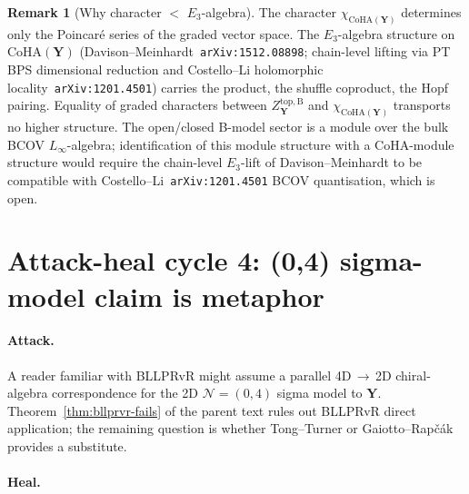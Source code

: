 \documentclass[11pt]{amsart}
\theoremstyle{definition}
\newtheorem{remark}[theorem]{Remark}
\providecommand{\CoHA}{\mathrm{CoHA}}
\providecommand{\bY}{\mathbf{Y}}
\providecommand{\cN}{\mathcal{N}}
\begin{document}
\begin{remark}[Why character $<$ $E_3$-algebra]
The character $\chi_{\CoHA(\bY)}$ determines only the Poincaré series
of the graded vector space. The $E_3$-algebra structure on $\CoHA(\bY)$
(Davison--Meinhardt~\texttt{arXiv:1512.08898}; chain-level
lifting via PT BPS dimensional reduction and Costello--Li holomorphic
locality~\texttt{arXiv:1201.4501}) carries the product, the shuffle
coproduct, the Hopf pairing. Equality of graded characters between
$Z^{\mathrm{top,B}}_{\bY}$ and $\chi_{\CoHA(\bY)}$ transports no
higher structure. The open/closed B-model sector is a module over the
bulk BCOV $L_\infty$-algebra; identification of this module structure
with a $\CoHA$-module structure would require the chain-level
$E_3$-lift of Davison--Meinhardt to be compatible with
Costello--Li~\texttt{arXiv:1201.4501} BCOV quantisation, which is
open.
\end{remark}

\section{Attack-heal cycle 4: (0,4) sigma-model claim is metaphor}

\paragraph*{Attack.}
A reader familiar with BLLPRvR might assume a parallel
4D$\,\to\,$2D chiral-algebra correspondence for the 2D $\cN=(0,4)$
sigma model to $\bY$. Theorem~\ref{thm:bllprvr-fails} of the parent
text rules out BLLPRvR direct application; the remaining question
is whether Tong--Turner or Gaiotto--Rap\v{c}\'ak provides a substitute.

\paragraph*{Heal.}
\end{document}
